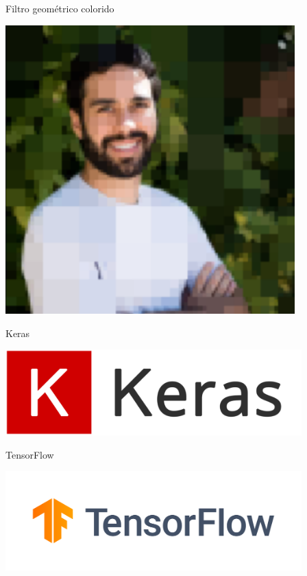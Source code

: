 \documentclass[
  ignorenonframetext,
]{beamer}
\begin{document}
\begin{frame}{Filtro geométrico colorido}
\protect\hypertarget{filtro-geomuxe9trico-colorido-8}{}

\small

\includegraphics[width=4.4in]{IMAGENS/guilherme2}

\begin{center}
\tiny{}
\end{center}

\end{frame}

\begin{frame}{Keras}
\protect\hypertarget{keras}{}

\includegraphics[width=4.5in]{IMAGENS/Keras_logo}

\begin{center}
\tiny{}
\end{center}

\end{frame}

\begin{frame}{TensorFlow}
\protect\hypertarget{tensorflow}{}

\includegraphics[width=4.5in]{IMAGENS/TensorFlow_logo}

\begin{center}
\tiny{}
\end{center}

\end{frame}
\end{document}
